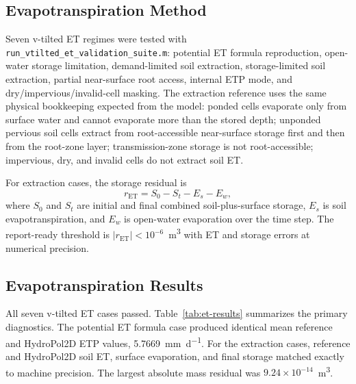 \documentclass[11pt]{article}
\begin{document}
\subsection{Evapotranspiration Method}
\label{sec:evapotranspiration-method}
Seven v-tilted ET regimes were tested with \texttt{run\_vtilted\_et\_validation\_suite.m}: potential ET formula reproduction, open-water storage limitation, demand-limited soil extraction, storage-limited soil extraction, partial near-surface root access, internal ETP mode, and dry/impervious/invalid-cell masking. The extraction reference uses the same physical bookkeeping expected from the model: ponded cells evaporate only from surface water and cannot evaporate more than the stored depth; unponded pervious soil cells extract from root-accessible near-surface storage first and then from the root-zone layer; transmission-zone storage is not root-accessible; impervious, dry, and invalid cells do not extract soil ET.

For extraction cases, the storage residual is
\begin{equation}
r_{\mathrm{ET}} = S_0 - S_t - E_s - E_w,
\end{equation}
where $S_0$ and $S_t$ are initial and final combined soil-plus-surface storage, $E_s$ is soil evapotranspiration, and $E_w$ is open-water evaporation over the time step. The report-ready threshold is $|r_{\mathrm{ET}}| < 10^{-6}$~\si{\cubic\meter} with ET and storage errors at numerical precision.

\subsection{Evapotranspiration Results}
\label{sec:evapotranspiration-results}
All seven v-tilted ET cases passed. Table~\ref{tab:et-results} summarizes the primary diagnostics. The potential ET formula case produced identical mean reference and HydroPol2D ETP values, \SI{5.7669}{\milli\meter\per\day}. For the extraction cases, reference and HydroPol2D soil ET, surface evaporation, and final storage matched exactly to machine precision. The largest absolute mass residual was $9.24\times10^{-14}$~\si{\cubic\meter}.
\end{document}
